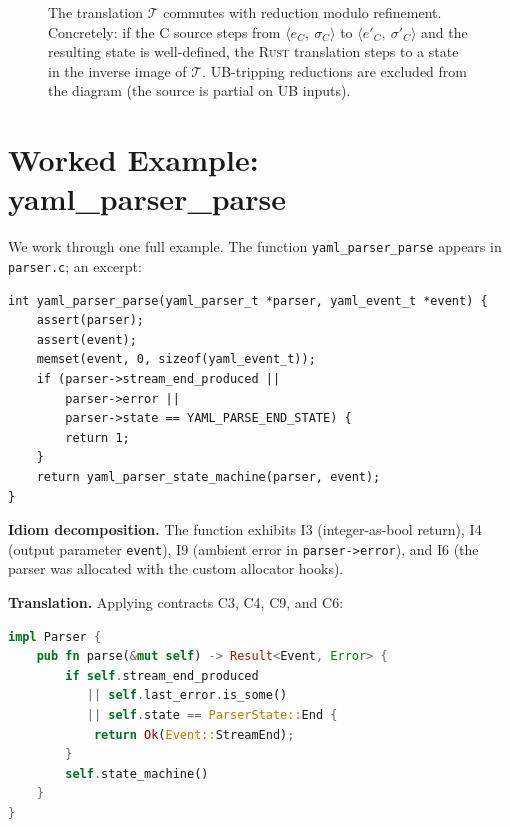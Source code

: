 \documentclass[12pt]{article}
\newcommand{\Conf}[2]{\langle #1,\ #2\rangle}
\newcommand{\reduces}{\longrightarrow}
\newcommand{\Store}{\sigma}
\newcommand{\T}{\mathcal{T}}
\newcommand{\rust}{\textnormal{\textsc{Rust}}}
\newcommand{\clang}{\textnormal{\textsc{C}}}
\theoremstyle{definition}
\theoremstyle{remark}
\begin{document}
\begin{figure}[h]
\centering
{}
\caption{The translation \(\T\) commutes with reduction modulo refinement. Concretely: if the \clang{} source steps from \(\Conf{e_C}{\Store_C}\) to \(\Conf{e'_C}{\Store'_C}\) and the resulting state is well-defined, the \rust{} translation steps to a state in the inverse image of \(\T\). UB-tripping reductions are excluded from the diagram (the source is partial on UB inputs).}
\label{fig:diagram}
\end{figure}

\section{Worked Example: yaml\_parser\_parse}
\label{sec:example}

We work through one full example. The function \texttt{yaml\_parser\_parse} appears in \texttt{parser.c}; an excerpt:

\begin{lstlisting}[style=cstyle]
int yaml_parser_parse(yaml_parser_t *parser, yaml_event_t *event) {
    assert(parser);
    assert(event);
    memset(event, 0, sizeof(yaml_event_t));
    if (parser->stream_end_produced ||
        parser->error ||
        parser->state == YAML_PARSE_END_STATE) {
        return 1;
    }
    return yaml_parser_state_machine(parser, event);
}
\end{lstlisting}

\textbf{Idiom decomposition.} The function exhibits I3 (integer-as-bool return), I4 (output parameter \texttt{event}), I9 (ambient error in \texttt{parser->error}), and I6 (the parser was allocated with the custom allocator hooks).

\textbf{Translation.} Applying contracts C3, C4, C9, and C6:

\begin{lstlisting}[style=ruststyle, language=Rust]
impl Parser {
    pub fn parse(&mut self) -> Result<Event, Error> {
        if self.stream_end_produced
           || self.last_error.is_some()
           || self.state == ParserState::End {
            return Ok(Event::StreamEnd);
        }
        self.state_machine()
    }
}
\end{lstlisting}
\end{document}
